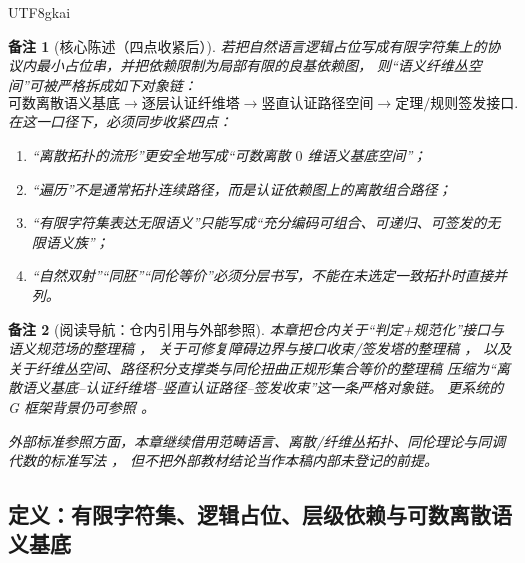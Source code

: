 \documentclass[12pt]{article}
\newtheorem{remark}{备注}[section]
\begin{document}
\begin{CJK*}{UTF8}{gkai}
\begin{remark}[核心陈述（四点收紧后）]
若把自然语言逻辑占位写成有限字符集上的协议内最小占位串，并把依赖限制为局部有限的良基依赖图，
则“语义纤维丛空间”可被严格拆成如下对象链：
\[
  \text{可数离散语义基底}
  \to
  \text{逐层认证纤维塔}
  \to
  \text{竖直认证路径空间}
  \to
  \text{定理/规则签发接口}.
\]
在这一口径下，必须同步收紧四点：
\begin{enumerate}
  \item “离散拓扑的流形”更安全地写成“可数离散 $0$ 维语义基底空间”；
  \item “遍历”不是通常拓扑连续路径，而是认证依赖图上的离散组合路径；
  \item “有限字符集表达无限语义”只能写成“充分编码可组合、可递归、可签发的无限语义族”；
  \item “自然双射”“同胚”“同伦等价”必须分层书写，不能在未选定一致拓扑时直接并列。
\end{enumerate}
\end{remark}

\begin{remark}[阅读导航：仓内引用与外部参照]
本章把仓内关于“判定+规范化”接口与语义规范场的整理稿 \cite{RepoTex20SemanticGaugeNormalization,RepoTex21AuditedWrapper,RepoTex23SemanticBase}，
关于可修复障碍边界与接口收束/签发塔的整理稿 \cite{RepoTex29RepairableObstruction,RepoTex35ExtendedCertificationTower}，
以及关于纤维丛空间、路径积分支撑类与同伦扭曲正规形集合等价的整理稿 \cite{RepoTex36HomotopyTwistBijection}
压缩为“离散语义基底--认证纤维塔--竖直认证路径--签发收束”这一条严格对象链。
更系统的 G 框架背景仍可参照 \cite{GaoZhengAppVol2,GaoZhengAppVol3,GaoZheng2025GFramework}。

外部标准参照方面，本章继续借用范畴语言、离散/纤维丛拓扑、同伦理论与同调代数的标准写法 \cite{MacLane1998Categories,Hatcher2002AT,Weibel1994HomologicalAlgebra,
  KobayashiNomizu1963Foundations}，
但不把外部教材结论当作本稿内部未登记的前提。
\end{remark}

\subsection{定义：有限字符集、逻辑占位、层级依赖与可数离散语义基底}
\label{subsec:tex37-ch13-defs}


\end{CJK*}
\end{document}

